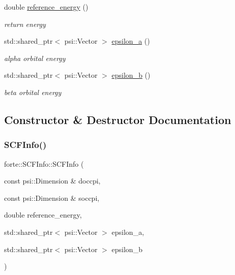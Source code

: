 \begin{DoxyCompactItemize}
double \mbox{\hyperlink{classforte_1_1_s_c_f_info_ac2c9c172c0a76720d80c2aae2fe0fb92}{reference\+\_\+energy}} ()
\begin{DoxyCompactList}\small\item\em return energy \end{DoxyCompactList}\item 
std\+::shared\+\_\+ptr$<$ psi\+::\+Vector $>$ \mbox{\hyperlink{classforte_1_1_s_c_f_info_aa28a836920447e78d806523759d46d7e}{epsilon\+\_\+a}} ()
\begin{DoxyCompactList}\small\item\em alpha orbital energy \end{DoxyCompactList}\item 
std\+::shared\+\_\+ptr$<$ psi\+::\+Vector $>$ \mbox{\hyperlink{classforte_1_1_s_c_f_info_ae7bece269ec34eee0f9e47bd07d69a44}{epsilon\+\_\+b}} ()
\begin{DoxyCompactList}\small\item\em beta orbital energy \end{DoxyCompactList}\end{DoxyCompactItemize}


\subsection{Constructor \& Destructor Documentation}
\mbox{\label{classforte_1_1_s_c_f_info_a56e6edb474dc1190fd2a3846275e2727}} 
\subsubsection{\texorpdfstring{S\+C\+F\+Info()}{SCFInfo()}\hspace{0.1cm}{\footnotesize\ttfamily [1/2]}}
{\footnotesize\ttfamily forte\+::\+S\+C\+F\+Info\+::\+S\+C\+F\+Info (\begin{DoxyParamCaption}\item[{const psi\+::\+Dimension \&}]{doccpi,  }\item[{const psi\+::\+Dimension \&}]{soccpi,  }\item[{double}]{reference\+\_\+energy,  }\item[{std\+::shared\+\_\+ptr$<$ psi\+::\+Vector $>$}]{epsilon\+\_\+a,  }\item[{std\+::shared\+\_\+ptr$<$ psi\+::\+Vector $>$}]{epsilon\+\_\+b }\end{DoxyParamCaption})}



